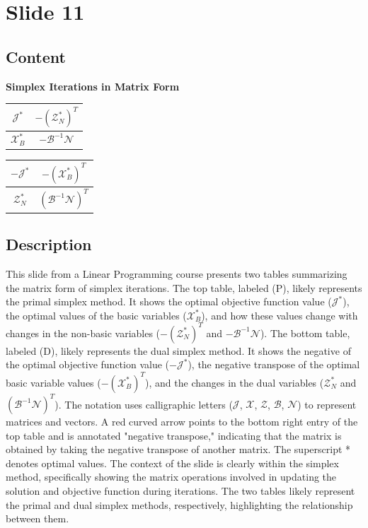 \documentclass{article}%
\begin{document}
%
\newpage%
\section{Slide 11}%
\label{sec:Slide11}%
\subsection{Content}%

\textbf{Simplex Iterations in Matrix Form} \\
\begin{tabular}{|c|c|}
\hline
$\mathcal{J}^*$ & $-(\mathcal{Z}_N^*)^T$ \\
\hline
$\mathcal{X}_B^*$ & $-\mathcal{B}^{-1}\mathcal{N}$ \\
\hline
\end{tabular}
\qquad
\begin{tabular}{|c|c|}
\hline
$-\mathcal{J}^*$ & $-(\mathcal{X}_B^*)^T$ \\
\hline
$\mathcal{Z}_N^*$ & $(\mathcal{B}^{-1}\mathcal{N})^T$ \\
\hline
\end{tabular}
%
\subsection{Description}%
This slide from a Linear Programming course presents two tables summarizing the matrix form of simplex iterations.  The top table, labeled (P), likely represents the primal simplex method. It shows the optimal objective function value ($\mathcal{J}^*$), the optimal values of the basic variables ($\mathcal{X}_B^*$), and how these values change with changes in the non-basic variables ($-(\mathcal{Z}_N^*)^T$ and $-\mathcal{B}^{-1}\mathcal{N}$).  The bottom table, labeled (D), likely represents the dual simplex method. It shows the negative of the optimal objective function value ($-\mathcal{J}^*$), the negative transpose of the optimal basic variable values ($-(\mathcal{X}_B^*)^T$), and the changes in the dual variables ($\mathcal{Z}_N^*$ and $(\mathcal{B}^{-1}\mathcal{N})^T$).  The notation uses calligraphic letters ($\mathcal{J}$, $\mathcal{X}$, $\mathcal{Z}$, $\mathcal{B}$, $\mathcal{N}$) to represent matrices and vectors.  A red curved arrow points to the bottom right entry of the top table and is annotated "negative transpose," indicating that the matrix is obtained by taking the negative transpose of another matrix. The superscript * denotes optimal values. The context of the slide is clearly within the simplex method, specifically showing the matrix operations involved in updating the solution and objective function during iterations. The two tables likely represent the primal and dual simplex methods, respectively, highlighting the relationship between them.%
\end{document}
